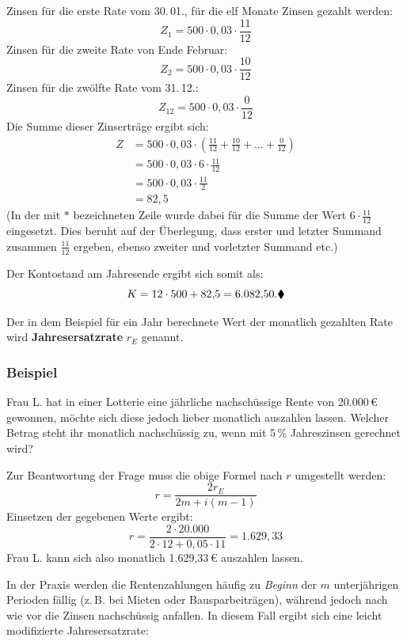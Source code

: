 Zinsen für die erste Rate vom 30.\,01., für die elf Monate Zinsen gezahlt werden:
\[ Z_1 = 500 \cdot 0{,}03 \cdot \frac{11}{12} \]
Zinsen für die zweite Rate von Ende Februar:
\[ Z_2 = 500 \cdot 0{,}03 \cdot \frac{10}{12} \]
Zinsen für die zwölfte Rate vom 31.\,12.:
\[ Z_{12} = 500 \cdot 0{,}03 \cdot \frac{0}{12} \]
Die Summe dieser Zinserträge ergibt sich:
\begin{align*}
  Z &= 500 \cdot 0{,}03 \cdot \left(\tfrac{11}{12} + \tfrac{10}{12} + \ldots + \tfrac{0}{12}\right)\\
  &= 500 \cdot 0{,}03 \cdot 6 \cdot \tfrac{11}{12}\\
  &= 500 \cdot 0{,}03 \cdot \tfrac{11}{2}\\
  &= 82{,}5
\end{align*}
(In der mit $*$ bezeichneten Zeile wurde dabei für die Summe der Wert $6 \cdot \tfrac{11}{12}$ eingesetzt. Dies beruht auf der Überlegung, dass erster und letzter Summand zusammen $\tfrac{11}{12}$ ergeben, ebenso zweiter und vorletzter Summand etc.)

Der Kontostand am Jahresende ergibt sich somit als:
\[ K = 12 \cdot 500 + 82{,}5 = 6.082{,}50 .\beispielende \]

Der in dem Beispiel für ein Jahr berechnete Wert der monatlich gezahlten Rate wird \textbf{Jahresersatzrate} $r_E$ genannt.


\subsubsection{Beispiel}

Frau L. hat in einer Lotterie eine jährliche nachschüssige Rente von 20.000\,€ gewonnen, möchte sich diese jedoch lieber monatlich auszahlen lassen. Welcher Betrag steht ihr monatlich nachschüssig zu, wenn mit 5\,\% Jahreszinsen gerechnet wird?

Zur Beantwortung der Frage muss die obige Formel nach $r$ umgestellt werden:
\[ r = \frac{2 r_E}{2m + i(m - 1)} \]
Einsetzen der gegebenen Werte ergibt:
\[ r = \frac{2 \cdot 20.000}{2 \cdot 12 + 0{,}05 \cdot 11} = 1.629{,}33 \]
Frau L. kann sich also monatlich 1.629{,}33\,€ auszahlen lassen.\beispielende

In der Praxis werden die Rentenzahlungen häufig zu \emph{Beginn} der $m$ unterjährigen Perioden fällig (z.\,B. bei Mieten oder Bausparbeiträgen), während jedoch nach wie vor die Zinsen nachschüssig anfallen. In diesem Fall ergibt sich eine leicht modifizierte Jahresersatzrate:

